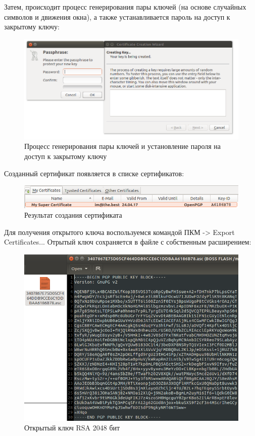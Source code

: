 \documentclass[14pt,a4paper,report]{report}
\begin{document}
Затем, происходит процесс генерирования пары ключей (на основе случайных символов и движения окна), а также устанавливается пароль на доступ к закрытому ключу:

\begin{figure}[h!]
	\centering
	\includegraphics[scale = 0.65]{images/1_3.png}
	
	\caption{Процесс генерирования пары ключей и установление пароля на доступ к закрытому ключу}
	\label{image:3}
\end{figure}

Созданный сертификат появляется в списке сертификатов:

\begin{figure}[h!]
	\centering
	\includegraphics[scale = 0.65]{images/1_4.png}
	
	\caption{Результат создания сертификата}
	\label{image:4}
\end{figure}

Для получения открытого ключа воспользуемся командой ПКМ -> Export Certificates... Отрытый ключ сохраняется в файле с собственным расширением:

\begin{figure}[h!]
	\centering
	\includegraphics[scale = 0.65]{images/1_5.png}
	
	\caption{Открытый ключ RSA 2048 бит}
	\label{image:5}
\end{figure}
\end{document}
